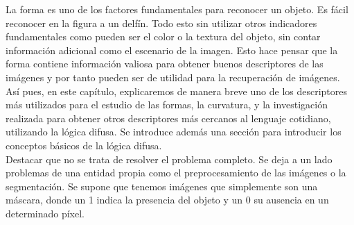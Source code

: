 La forma es uno de los factores fundamentales para reconocer un objeto. Es fácil reconocer en la figura  a un delfín. Todo esto sin utilizar otros indicadores fundamentales como pueden ser el color o la textura del objeto, sin contar información adicional como el escenario de la imagen. Esto hace pensar que la forma contiene información valiosa para obtener buenos descriptores de las imágenes y por tanto pueden ser de utilidad para la recuperación de imágenes.\\

Así pues, en este capítulo, explicaremos de manera breve uno de los descriptores más utilizados para el estudio de las formas, la curvatura, y la investigación realizada para obtener otros descriptores más cercanos al lenguaje cotidiano, utilizando la lógica difusa. Se introduce además una sección para introducir los conceptos básicos de la lógica difusa.\\

Destacar que no se trata de resolver el problema completo. Se deja a un lado problemas de una entidad propia como el preprocesamiento de las imágenes o la segmentación. Se supone que tenemos imágenes que simplemente son una máscara, donde un 1 indica la presencia del objeto y un 0 su ausencia en un determinado píxel.